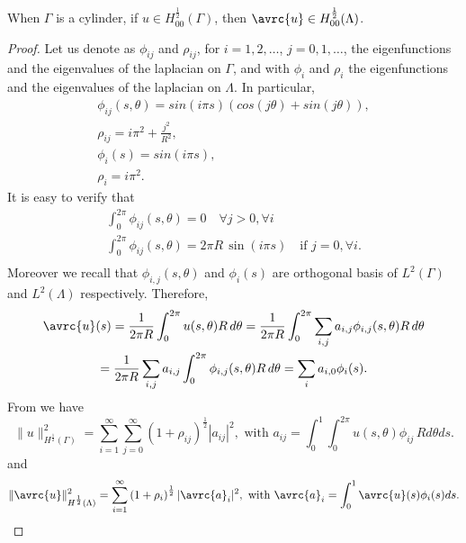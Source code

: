 \begin{lemma}\label{lemma:H12norm}
When $\Gamma$ is a cylinder, if $u\in H_{00}^{\frac 12}(\Gamma)$, then $\avrc{u}\in H_{00}^{\frac 12}(\Lambda)$.
\end{lemma}
\begin{proof}
Let us denote as $\phi _{ij}$ and $\rho _{ij}$, for $i=1,2,\dots$, $j=0,1,\dots$, the eigenfunctions and the eigenvalues of the laplacian on $\Gamma$, and with $\phi _i$ and $\rho _i$ the eigenfunctions and the eigenvalues of the laplacian on $\Lambda$. In particular,
\begin{align*}
\phi _{ij}(s,\theta)=sin (i\pi s)\left( cos(j\theta)+ sin(j\theta) \right),\\
\rho_{ij}=i\pi ^2+\frac{j^2}{R^2},\\
\phi _{i}(s)=sin (i\pi s),\\
\rho _i = i\pi ^2.
\end{align*}
It is easy to verify that 
\begin{eqnarray}
\label{null_int_eigenf}
\int_0^{2\pi} \phi _{ij}(s,\theta)=0 \quad \forall j>0, \forall i \\
\label{nonull_int_eigenf}
\int_0^{2\pi} \phi _{ij}(s,\theta)= 2\pi R \, \sin(i \pi s) \quad \mbox{if } j=0, \forall i  .\\
\end{eqnarray}
Moreover we recall that $\phi_{i,j}(s,\theta)$ and $\phi _i(s)$ are orthogonal basis of $L^2(\Gamma)$ and $L^2(\Lambda)$ respectively. Therefore,
\begin{multline*}
\avrc{u}(s)=\frac{1}{2\pi R}\int_0^{2\pi} u(s,\theta)R\, d\theta
= \frac{1}{2\pi R}\int_0^{2\pi} \sum_{i,j} a_{i,j} \phi_{i,j}(s,\theta) R\, d\theta
\\= \frac{1}{2\pi R}\sum_{i,j} a_{i,j}\int_0^{2\pi}  \phi_{i,j}(s,\theta) R\, d\theta
=  \sum_{i} a_{i,0} \phi_{i}(s).
\end{multline*}
From \cite[Lemma 4.11]{chandler2015interpolation} we have
\begin{equation}\label{H12norm_Gamma}
\|u\|^2_{H^{\frac 12}(\Gamma)}=\sum_{i=1}^{\infty}\sum_{j=0}^{\infty} \left( 1+ \rho_{ij}\right)^{\frac 12}|a_{ij}|^2,
\text{ with }
a_{ij}=\int _0^1\int _0^{2\pi} u(s,\theta )\phi_{ij}\, R d\theta ds.
\end{equation}
and 
\begin{equation*}
\|\avrc{u}\|^2_{H^{\frac 12}(\Lambda)}=\sum_{i=1}^{\infty} \left( 1+ \rho_{i}\right)^{\frac 12}|\avrc{a}_i|^2,
\text{ with }
\avrc{a}_i=\int _0^1 \avrc{u}(s )\phi_{i}(s) ds.
\end{equation*}


\end{proof}
